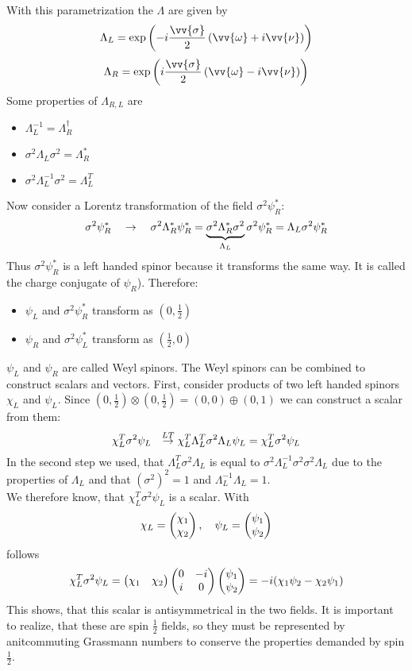 With this parametrization the $\Lambda$ are given by
\[ \Lambda_L = \exp\left( -i \frac{\vv{\sigma}}{2} \left(\vv{\omega} + i \vv{\nu}\right)\right)\]
\[ \Lambda_R = \exp\left( i \frac{\vv{\sigma}}{2} \left( \vv{\omega} - i \vv{\nu}\right)\right)\]
Some properties of $\Lambda_{R,L}$ are
\begin{itemize}
\item $\Lambda_L^{-1} = \Lambda_R^\dagger$
\item $\sigma^2 \Lambda_L \sigma^2 = \Lambda_R^*$
\item $\sigma^2 \Lambda_L^{-1} \sigma^2 = \Lambda_L^T$
\end{itemize}
Now consider a Lorentz transformation of the field $\sigma^2 \psi_R^*$:
\[ \sigma^2 \psi_R^* ~~~\rightarrow~~~ \sigma^2 \Lambda_R^*\psi_R^* = \underbrace{\sigma^2 \Lambda_R^*\sigma^2}_{\Lambda_L} \sigma^2 \psi_R^* = \Lambda_L \sigma^2 \psi_R^*\]
Thus $\sigma^2 \psi_R^*$ is a left handed spinor because it transforms the same way. It is called the charge conjugate of $\psi_R$). Therefore:
\begin{itemize}
\item $\psi_L$ and $\sigma^2\psi_R^*$ transform as $\left(0, \frac{1}{2}\right)$
\item $\psi_R$ and $\sigma^2\psi_L^*$ transform as $\left(\frac{1}{2}, 0\right)$
\end{itemize}
$\psi_L$ and $\psi_R$ are called Weyl spinors.
The Weyl spinors can be combined to construct scalars and vectors. First, consider products of two left handed spinors $\chi_L$ and $\psi_L$. Since $\left( 0, \frac{1}{2}\right) \otimes \left( 0, \frac{1}{2}\right) = (0,0) \oplus (0,1)$ we can construct a scalar from them:
\[ \chi_L^T \sigma^2 \psi_L ~~\overset{LT}{\rightarrow} \chi_L^T \Lambda_L^T \sigma^2 \Lambda_L \psi_L = \chi_L^T \sigma^2 \psi_L\]
In the second step we used, that $\Lambda_L^T \sigma^2 \Lambda_L$ is equal to $\sigma^2 \Lambda_L^{-1}\sigma^2\sigma^2 \Lambda_L$ due to the properties of $\Lambda_{L}$ and that $(\sigma^2)^2= 1$ and $\Lambda_L^{-1}\Lambda_L = 1$. \\
We therefore know, that $\chi^T_L\sigma^2\psi_L$ is a scalar. With
\[ \chi_L = \begin{pmatrix} \chi_1 \\ \chi_2 \end{pmatrix}, ~~~ \psi_L = \begin{pmatrix} \psi_1 \\ \psi_2 \end{pmatrix}\]
follows
\[ \chi_L^T \sigma^2 \psi_L = \begin{pmatrix} \chi_1 & \chi_2\end{pmatrix} \begin{pmatrix}0&-i\\i&0\end{pmatrix} \begin{pmatrix} \psi_1 \\ \psi_2 \end{pmatrix} = - i (\chi_1 \psi_2 - \chi_2 \psi_1)\]
This shows, that this scalar is antisymmetrical in the two fields. It is important to realize, that these are spin $\frac{1}{2}$ fields, so they must be represented by anitcommuting Grassmann numbers to conserve the properties demanded by spin $\frac{1}{2}$.\\
